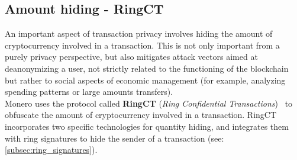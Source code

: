 \documentclass[conference]{IEEEtran}
\begin{document}

\subsection{Amount hiding - RingCT}
An important aspect of transaction privacy involves hiding the amount of cryptocurrency involved in a transaction. This is not only important from a purely privacy perspective, but also mitigates attack vectors aimed at deanonymizing a user, not strictly related to the functioning of the blockchain but rather to social aspects of economic management (for example, analyzing spending patterns or large amounts transfers).\\
Monero uses the protocol called \textbf{RingCT} (\textit{Ring Confidential
Transactions})~\cite{ringct, zero_to_monero_2} to obfuscate the amount of cryptocurrency involved in a transaction. RingCT incorporates two specific technologies for quantity hiding, and integrates them with ring signatures to hide the sender of a transaction (see: \autoref{subsec:ring_signatures}).\\
\end{document}
